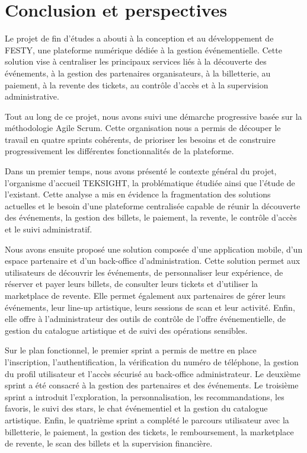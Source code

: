 \chapter*{Conclusion et perspectives}
\label{sec:conclusion}

Le projet de fin d’études a abouti à la conception et au développement de FESTY, une plateforme numérique dédiée à la gestion événementielle. Cette solution vise à centraliser les principaux services liés à la découverte des événements, à la gestion des partenaires organisateurs, à la billetterie, au paiement, à la revente des tickets, au contrôle d’accès et à la supervision administrative.

Tout au long de ce projet, nous avons suivi une démarche progressive basée sur la méthodologie Agile Scrum. Cette organisation nous a permis de découper le travail en quatre sprints cohérents, de prioriser les besoins et de construire progressivement les différentes fonctionnalités de la plateforme.

Dans un premier temps, nous avons présenté le contexte général du projet, l’organisme d’accueil TEKSIGHT, la problématique étudiée ainsi que l’étude de l’existant. Cette analyse a mis en évidence la fragmentation des solutions actuelles et le besoin d’une plateforme centralisée capable de réunir la découverte des événements, la gestion des billets, le paiement, la revente, le contrôle d’accès et le suivi administratif.

Nous avons ensuite proposé une solution composée d’une application mobile, d’un espace partenaire et d’un back-office d’administration. Cette solution permet aux utilisateurs de découvrir les événements, de personnaliser leur expérience, de réserver et payer leurs billets, de consulter leurs tickets et d’utiliser la marketplace de revente. Elle permet également aux partenaires de gérer leurs événements, leur line-up artistique, leurs sessions de scan et leur activité. Enfin, elle offre à l’administrateur des outils de contrôle de l’offre événementielle, de gestion du catalogue artistique et de suivi des opérations sensibles.

Sur le plan fonctionnel, le premier sprint a permis de mettre en place l’inscription, l’authentification, la vérification du numéro de téléphone, la gestion du profil utilisateur et l’accès sécurisé au back-office administrateur. Le deuxième sprint a été consacré à la gestion des partenaires et des événements. Le troisième sprint a introduit l’exploration, la personnalisation, les recommandations, les favoris, le suivi des stars, le chat événementiel et la gestion du catalogue artistique. Enfin, le quatrième sprint a complété le parcours utilisateur avec la billetterie, le paiement, la gestion des tickets, le remboursement, la marketplace de revente, le scan des billets et la supervision financière.

